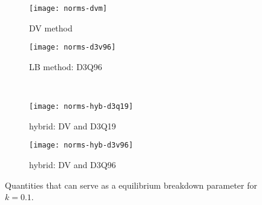 \documentclass{elsarticle} %
\begin{document}
\begin{figure}
    \centering
    \begin{subfigure}[b]{0.5\textwidth}
        \texttt{[image: norms-dvm]}
        \caption{DV method}
        \label{fig:norms:dvm}
    \end{subfigure}%
    \begin{subfigure}[b]{0.5\textwidth}
        \texttt{[image: norms-d3v96]}
        \caption{LB method: D3Q96}
        \label{fig:norms:d3q96}
    \end{subfigure}\\
    \begin{subfigure}[b]{0.5\textwidth}
        \texttt{[image: norms-hyb-d3q19]}
        \caption{hybrid: DV and D3Q19}
        \label{fig:norms:d3q19-hyb}
    \end{subfigure}%
    \begin{subfigure}[b]{0.5\textwidth}
        \texttt{[image: norms-hyb-d3v96]}
        \caption{hybrid: DV and D3Q96}
        \label{fig:norms:d3q96-hyb}
    \end{subfigure}
    \caption{
       Quantities that can serve as a equilibrium breakdown parameter for \(k=0.1\).
    }\label{fig:norms}
\end{figure}
\end{document}
